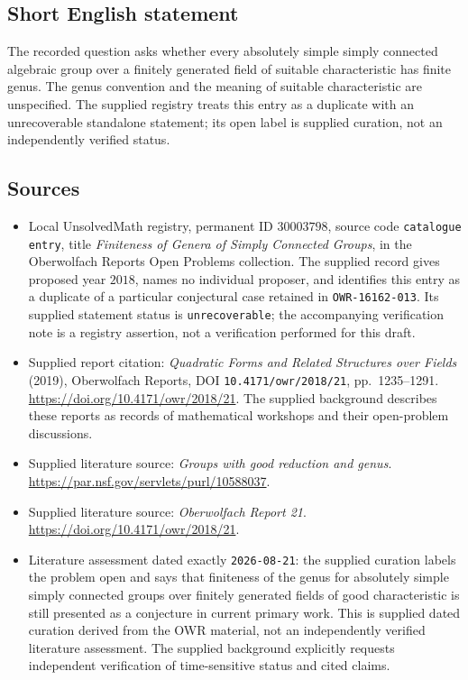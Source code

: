 \documentclass[11pt]{article}
\begin{document}
\subsection{Short English statement}
The recorded question asks whether every absolutely simple simply connected algebraic group over a finitely generated field of suitable characteristic has finite genus. The genus convention and the meaning of suitable characteristic are unspecified. The supplied registry treats this entry as a duplicate with an unrecoverable standalone statement; its open label is supplied curation, not an independently verified status.
\subsection{Sources}
\begin{itemize}
\item Local UnsolvedMath registry, permanent ID \(30003798\), source code \texttt{catalogue entry}, title \emph{Finiteness of Genera of Simply Connected Groups}, in the Oberwolfach Reports Open Problems collection. The supplied record gives proposed year \(2018\), names no individual proposer, and identifies this entry as a duplicate of a particular conjectural case retained in \texttt{OWR-16162-013}. Its supplied statement status is \texttt{unrecoverable}; the accompanying verification note is a registry assertion, not a verification performed for this draft.
\item Supplied report citation: \emph{Quadratic Forms and Related Structures over Fields} (2019), Oberwolfach Reports, DOI \texttt{10.4171/owr/2018/21}, pp.\ 1235--1291. \url{https://doi.org/10.4171/owr/2018/21}. The supplied background describes these reports as records of mathematical workshops and their open-problem discussions.
\item Supplied literature source: \emph{Groups with good reduction and genus}. \url{https://par.nsf.gov/servlets/purl/10588037}.
\item Supplied literature source: \emph{Oberwolfach Report 21}. \url{https://doi.org/10.4171/owr/2018/21}.
\item Literature assessment dated exactly \texttt{2026-08-21}: the supplied curation labels the problem open and says that finiteness of the genus for absolutely simple simply connected groups over finitely generated fields of good characteristic is still presented as a conjecture in current primary work. This is supplied dated curation derived from the OWR material, not an independently verified literature assessment. The supplied background explicitly requests independent verification of time-sensitive status and cited claims.
\end{itemize}
\end{document}
